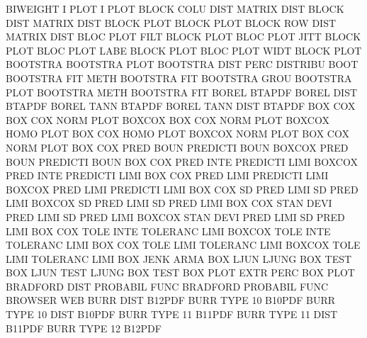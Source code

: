 BIWEIGHT I    PLOT                      I        PLOT
BLOCK    COLU DIST                      MATRIX   DIST
BLOCK    DIST                           MATRIX   DIST
BLOCK    PLOT                           BLOCK    PLOT
BLOCK    ROW  DIST                      MATRIX   DIST
BLOC     PLOT FILT                      BLOCK    PLOT
BLOC     PLOT JITT                      BLOCK    PLOT
BLOC     PLOT LABE                      BLOCK    PLOT
BLOC     PLOT WIDT                      BLOCK    PLOT
BOOTSTRA                                BOOTSTRA PLOT
BOOTSTRA DIST PERC                      DISTRIBU BOOT
BOOTSTRA FIT  METH                      BOOTSTRA FIT
BOOTSTRA GROU                           BOOTSTRA PLOT
BOOTSTRA METH                           BOOTSTRA FIT
BOREL                                   BTAPDF
BOREL    DIST                           BTAPDF
BOREL    TANN                           BTAPDF
BOREL    TANN DIST                      BTAPDF
BOX      COX                            BOX      COX  NORM PLOT
BOXCOX                                  BOX      COX  NORM PLOT
BOXCOX   HOMO PLOT                      BOX      COX  HOMO PLOT
BOXCOX   NORM PLOT                      BOX      COX  NORM PLOT
BOX      COX  PRED BOUN                 PREDICTI BOUN
BOXCOX   PRED BOUN                      PREDICTI BOUN
BOX      COX  PRED INTE                 PREDICTI LIMI
BOXCOX   PRED INTE                      PREDICTI LIMI
BOX      COX  PRED LIMI                 PREDICTI LIMI
BOXCOX   PRED LIMI                      PREDICTI LIMI
BOX      COX  SD   PRED LIMI            SD       PRED LIMI
BOXCOX   SD   PRED LIMI                 SD       PRED LIMI
BOX      COX  STAN DEVI PRED LIMI       SD       PRED LIMI
BOXCOX   STAN DEVI PRED LIMI            SD       PRED LIMI
BOX      COX  TOLE INTE                 TOLERANC LIMI
BOXCOX   TOLE INTE                      TOLERANC LIMI
BOX      COX  TOLE LIMI                 TOLERANC LIMI
BOXCOX   TOLE LIMI                      TOLERANC LIMI
BOX      JENK                           ARMA
BOX      LJUN                           LJUNG    BOX  TEST
BOX      LJUN TEST                      LJUNG    BOX  TEST
BOX      PLOT EXTR PERC                 BOX      PLOT
BRADFORD DIST                           PROBABIL FUNC
BRADFORD                                PROBABIL FUNC
BROWSER                                 WEB
BURR     DIST                           B12PDF
BURR     TYPE 10                        B10PDF
BURR     TYPE 10   DIST                 B10PDF
BURR     TYPE 11                        B11PDF
BURR     TYPE 11   DIST                 B11PDF
BURR     TYPE 12                        B12PDF
